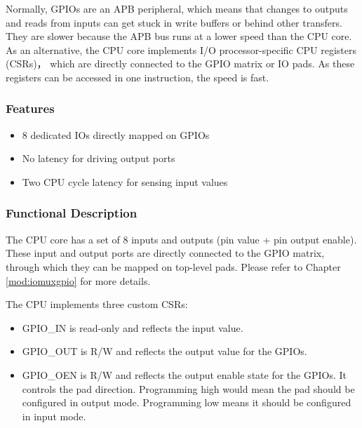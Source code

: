 \documentclass[main\_\_EN.tex]{subfiles}
\begin{document}
Normally, GPIOs are an APB peripheral, which means that changes to outputs and reads from inputs can get stuck in write buffers or behind other transfers. They are slower because the APB bus runs at a lower speed than the CPU core.
As an alternative, the CPU core implements I/O processor-specific CPU registers (CSRs)， which are directly connected to the GPIO matrix or IO pads. As these registers can be accessed in one instruction, the speed is fast.

\subsubsection{Features}
\label{sec:riscvcpu-fastio-features}
 \begin{itemize}
    \item 8 dedicated IOs directly mapped on GPIOs
    \item No latency for driving output ports
    \item Two CPU cycle latency for sensing input values
\end{itemize}

\subsubsection{Functional Description}
\label{sec:riscvcpu-fastio-func-descr}

The CPU core has a set of 8 inputs and outputs (pin value + pin output enable). These input and output ports are directly connected to the GPIO matrix, through which they can be mapped on top-level pads. Please refer to Chapter \ref{mod:iomuxgpio} \textit{} for more details.

The CPU implements three custom CSRs:
\begin{itemize}
    \item GPIO\_IN is read-only and reflects the input value.
    \item GPIO\_OUT is R/W and reflects the output value for the GPIOs.
    \item GPIO\_OEN is R/W and reflects the output enable state for the GPIOs. It controls the pad direction. Programming high would mean the pad should be configured in output mode. Programming low means it should be configured in input mode.
\end{itemize}


\newpage
\hypertarget{riscvcpu-fastio-reg-summ}{}
\end{document}

